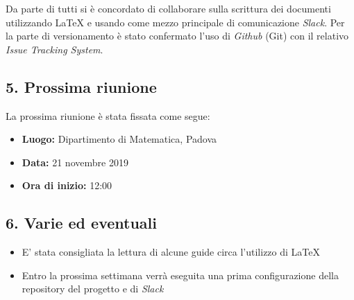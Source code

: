 Da parte di tutti si è concordato di collaborare sulla scrittura dei documenti utilizzando \LaTeX{} e usando come mezzo principale di comunicazione \textit{Slack}. Per la parte di versionamento è stato confermato l'uso di \textit{Github} (Git) con il relativo \textit{Issue Tracking System}.

\subsection*{5. Prossima riunione}

La prossima riunione è stata fissata come segue:
\begin{itemize}
	\item \textbf{Luogo:} Dipartimento di Matematica, Padova
	\item \textbf{Data:} 21 novembre 2019
	\item \textbf{Ora di inizio:} 12:00
\end{itemize}


\subsection*{6. Varie ed eventuali}

\begin{itemize}
	\item E' stata consigliata la lettura di alcune guide circa l'utilizzo di \LaTeX 
	\item Entro la prossima settimana verrà eseguita una prima configurazione della repository del progetto e di \textit{Slack}
\end{itemize}